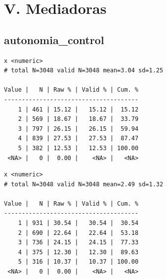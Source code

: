 \documentclass[
  letterpaper,
  DIV=11,
  numbers=noendperiod]{scrreprt}
\newenvironment{Shaded}{\begin{snugshade}}{\end{snugshade}}
\newcommand{\FunctionTok}[1]{\textcolor[rgb]{0.28,0.35,0.67}{#1}}
\newcommand{\NormalTok}[1]{\textcolor[rgb]{0.00,0.23,0.31}{#1}}
\newcommand{\SpecialCharTok}[1]{\textcolor[rgb]{0.37,0.37,0.37}{#1}}
\begin{document}
\hypertarget{v.-mediadoras}{%
\section{V. Mediadoras}\label{v.-mediadoras}}

\hypertarget{autonomia_control}{%
\subsection{autonomia\_control}\label{autonomia_control}}

\begin{Shaded}
\end{Shaded}

\begin{verbatim}
x <numeric> 
# total N=3048 valid N=3048 mean=3.04 sd=1.25

Value |   N | Raw % | Valid % | Cum. %
--------------------------------------
    1 | 461 | 15.12 |   15.12 |  15.12
    2 | 569 | 18.67 |   18.67 |  33.79
    3 | 797 | 26.15 |   26.15 |  59.94
    4 | 839 | 27.53 |   27.53 |  87.47
    5 | 382 | 12.53 |   12.53 | 100.00
 <NA> |   0 |  0.00 |    <NA> |   <NA>
\end{verbatim}

\begin{Shaded}
\end{Shaded}

\begin{verbatim}
x <numeric> 
# total N=3048 valid N=3048 mean=2.49 sd=1.32

Value |   N | Raw % | Valid % | Cum. %
--------------------------------------
    1 | 931 | 30.54 |   30.54 |  30.54
    2 | 690 | 22.64 |   22.64 |  53.18
    3 | 736 | 24.15 |   24.15 |  77.33
    4 | 375 | 12.30 |   12.30 |  89.63
    5 | 316 | 10.37 |   10.37 | 100.00
 <NA> |   0 |  0.00 |    <NA> |   <NA>
\end{verbatim}

\begin{Shaded}
\end{Shaded}
\end{document}
